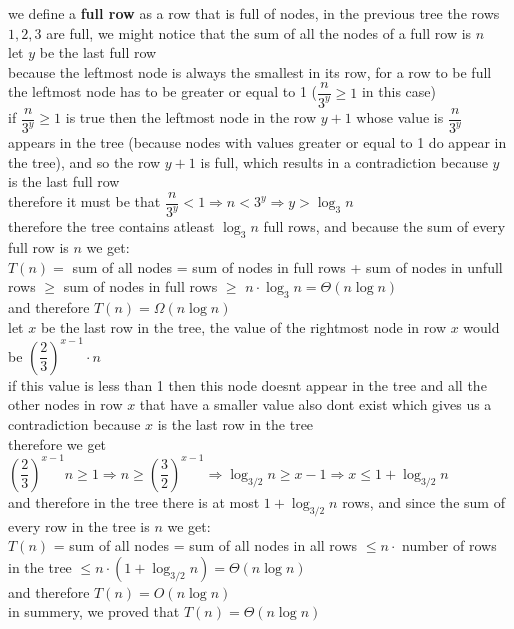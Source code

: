 \documentclass[a4paper,12pt]{article}
\begin{document}
\begin{my_example}
we define a \textbf{full row} as a row that is full of nodes, in the previous tree the rows \(1,2,3\) are full, we might notice that the sum of all the nodes of a full row is \(n\)\\[0pt]
let \(y\) be the last full row\\[0pt]
because the leftmost node is always the smallest in its row, for a row to be full the leftmost node has to be greater or equal to 1 (\(\dfrac{n}{3^y} \geq 1\) in this case)\\[0pt]
if \(\dfrac{n}{3^y} \geq 1\) is true then the leftmost node in the row \(y+1\) whose value is \(\dfrac{n}{3^y}\) appears in the tree (because nodes with values greater or equal to 1 do appear in the tree), and so the row \(y+1\) is full, which results in a contradiction because \(y\) is the last full row\\[0pt]
therefore it must be that \(\dfrac{n}{3^y} < 1 \Rightarrow n < 3^y \Rightarrow y > \log_3{n}\)\\[0pt]
therefore the tree contains atleast \(\log_3{n}\) full rows, and because the sum of every full row is \(n\) we get:\\[0pt]
\(T(n) =\) sum of all nodes = sum of nodes in full rows + sum of nodes in unfull rows \(\geq\) sum of nodes in full rows \(\geq\) \(n \cdot \log_3{n} = \Theta(n\log{n})\)\\[0pt]
and therefore \(T(n) = \Omega(n\log{n})\)\\[0pt]
let \(x\) be the last row in the tree, the value of the rightmost node in row \(x\) would be \({\left(\dfrac23\right)}^{x-1} \cdot n\)\\[0pt]
if this value is less than 1 then this node doesnt appear in the tree and all the other nodes in row \(x\) that have a smaller value also dont exist which gives us a contradiction because \(x\) is the last row in the tree\\[0pt]
therefore we get \({\left(\dfrac23\right)}^{x-1}n \geq 1 \Rightarrow n \geq {\left(\dfrac32\right)}^{x-1} \Rightarrow \log_{3/2}n \geq x - 1 \Rightarrow x \leq 1 + \log_{3/2}n\)\\[0pt]
and therefore in the tree there is at most \(1 + \log_{3/2}n\) rows, and since the sum of every row in the tree is \(n\) we get:\\[0pt]
\(T(n)\) = sum of all nodes = sum of all nodes in all rows \(\leq n \cdot\) number of rows in the tree \(\leq n \cdot (1+\log_{3/2}n) = \Theta(n\log{n})\)\\[0pt]
and therefore \(T(n) = O(n\log{n})\)\\[0pt]
in summery, we proved that \(T(n) = \Theta(n\log{n})\)\\[0pt]
\end{my_example}
\end{document}
